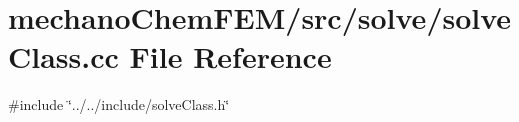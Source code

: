 \section{mechano\+Chem\+F\+E\+M/src/solve/solve\+Class.cc File Reference}
\label{solve_class_8cc}
{\ttfamily \#include \char`\"{}../../include/solve\+Class.\+h\char`\"{}}\newline
